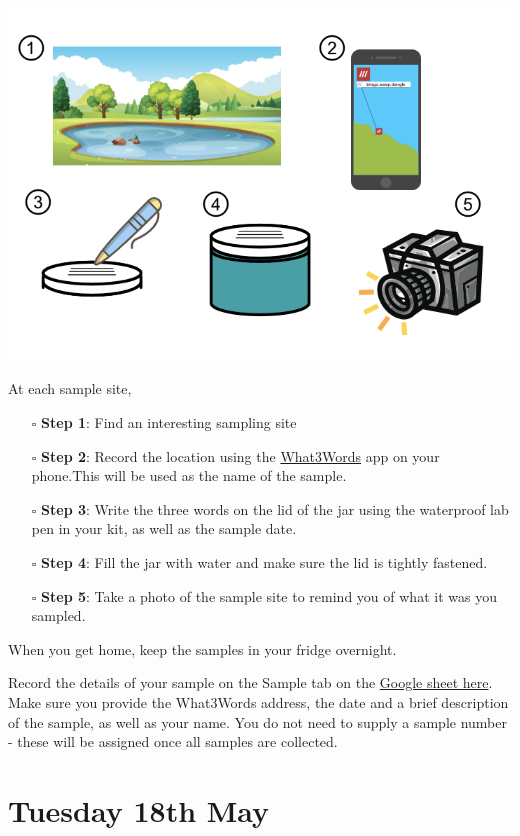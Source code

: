 \documentclass[
]{book}
\providecommand{\tightlist}{%
  \setlength{\itemsep}{0pt}\setlength{\parskip}{0pt}}
\begin{document}
\includegraphics{images/sampling.png}

At each sample site,

\begin{itemize}
\tightlist
\item[$\square$]
  \textbf{Step 1}: Find an interesting sampling site
\item[$\square$]
  \textbf{Step 2}: Record the location using the \href{https://what3words.com/}{What3Words} app on your phone.This will be used as the name of the sample.
\item[$\square$]
  \textbf{Step 3}: Write the three words on the lid of the jar using the waterproof lab pen in your kit, as well as the sample date.
\item[$\square$]
  \textbf{Step 4}: Fill the jar with water and make sure the lid is tightly fastened.
\item[$\square$]
  \textbf{Step 5}: Take a photo of the sample site to remind you of what it was you sampled.
\end{itemize}

When you get home, keep the samples in your fridge overnight.

Record the details of your sample on the Sample tab on the \href{https://docs.google.com/spreadsheets/d/1V6doztAX4AQ5657eH5r0GbJj_GnfMxTe4eKh7metXl0/edit?usp=sharing}{Google sheet here}. Make sure you provide the What3Words address, the date and a brief description of the sample, as well as your name. You do not need to supply a sample number - these will be assigned once all samples are collected.

\hypertarget{tuesday-18th-may}{%
\section{Tuesday 18th May}\label{tuesday-18th-may}}
\end{document}
